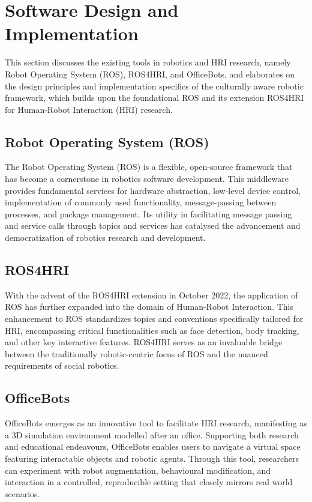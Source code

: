 
\chapter{Software Design and Implementation}

This section discusses the existing tools in robotics and HRI research, namely Robot Operating System (ROS), ROS4HRI, and OfficeBots, and elaborates on the design principles and implementation specifics of the culturally aware robotic framework, which builds upon the foundational ROS and its extension ROS4HRI for Human-Robot Interaction (HRI) research.

\section{Robot Operating System (ROS)}

The Robot Operating System (ROS) is a flexible, open-source framework that has become a cornerstone in robotics software development. This middleware provides fundamental services for hardware abstraction, low-level device control, implementation of commonly used functionality, message-passing between processes, and package management. Its utility in facilitating message passing and service calls through topics and services has catalysed the advancement and democratization of robotics research and development.

\section{ROS4HRI}

With the advent of the ROS4HRI extension in October 2022, the application of ROS has further expanded into the domain of Human-Robot Interaction. This enhancement to ROS standardizes topics and conventions specifically tailored for HRI, encompassing critical functionalities such as face detection, body tracking, and other key interactive features. ROS4HRI serves as an invaluable bridge between the traditionally robotic-centric focus of ROS and the nuanced requirements of social robotics.

\section{OfficeBots}

OfficeBots emerges as an innovative tool to facilitate HRI research, manifesting as a 3D simulation environment modelled after an office. Supporting both research and educational endeavours, OfficeBots enables users to navigate a virtual space featuring interactable objects and robotic agents. Through this tool, researchers can experiment with robot augmentation, behavioural modification, and interaction in a controlled, reproducible setting that closely mirrors real world scenarios.

